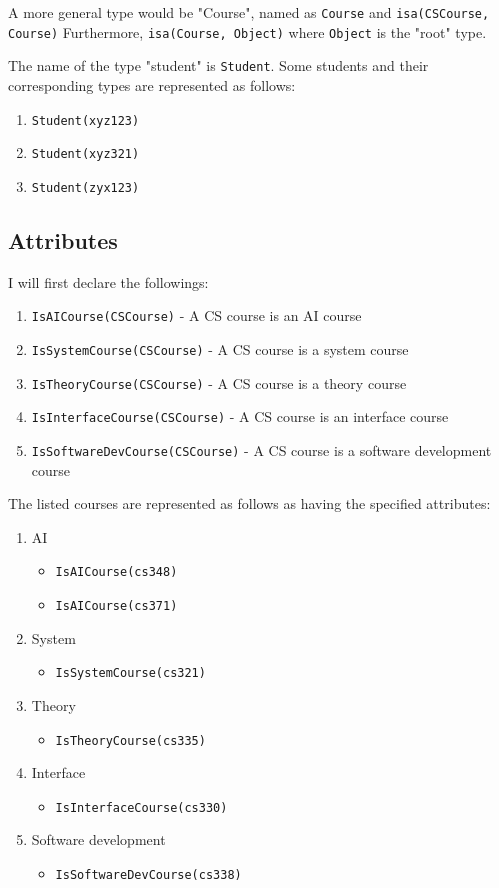 \documentclass[11pt]{article}
\begin{document}
A more general type would be "Course", named as \texttt{Course} and \texttt{isa(CSCourse, Course)}
Furthermore, \texttt{isa(Course, Object)} where \texttt{Object} is the "root" type. 

The name of the type "student" is \texttt{Student}.
Some students and their corresponding types are represented as follows:
\begin{enumerate}
  \item \texttt{Student(xyz123)}
  \item \texttt{Student(xyz321)}
  \item \texttt{Student(zyx123)}
\end{enumerate}

\subsection{Attributes}

I will first declare the followings:
\begin{enumerate}
  \item \texttt{IsAICourse(CSCourse)} - A CS course is an AI course
  \item \texttt{IsSystemCourse(CSCourse)} - A CS course is a system course
  \item \texttt{IsTheoryCourse(CSCourse)} - A CS course is a theory course
  \item \texttt{IsInterfaceCourse(CSCourse)} - A CS course is an interface course
  \item \texttt{IsSoftwareDevCourse(CSCourse)} - A CS course is a software development course
\end{enumerate}


The listed courses are represented as follows as having the specified attributes:
\begin{enumerate}
  \item AI
  \begin{itemize}
    \item \texttt{IsAICourse(cs348)}
    \item \texttt{IsAICourse(cs371)}
  \end{itemize}
  \item System
  \begin{itemize}
    \item \texttt{IsSystemCourse(cs321)}
  \end{itemize}
  \item Theory
  \begin{itemize}
    \item \texttt{IsTheoryCourse(cs335)}
  \end{itemize}
  \item Interface
  \begin{itemize}
    \item \texttt{IsInterfaceCourse(cs330)}
  \end{itemize}
  \item Software development
  \begin{itemize}
    \item \texttt{IsSoftwareDevCourse(cs338)}
  \end{itemize}
\end{enumerate}
\end{document}

